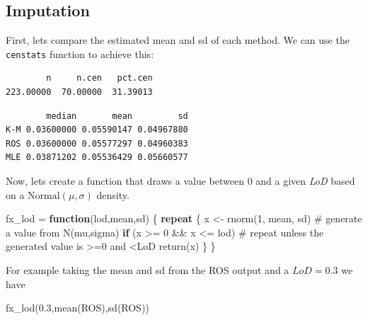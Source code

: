 \documentclass[
  letterpaper,
  DIV=11,
  numbers=noendperiod]{scrartcl}
\newenvironment{Shaded}{\begin{snugshade}}{\end{snugshade}}
\newcommand{\CommentTok}[1]{\textcolor[rgb]{0.37,0.37,0.37}{#1}}
\newcommand{\ControlFlowTok}[1]{\textcolor[rgb]{0.00,0.23,0.31}{\textbf{#1}}}
\newcommand{\DecValTok}[1]{\textcolor[rgb]{0.68,0.00,0.00}{#1}}
\newcommand{\FloatTok}[1]{\textcolor[rgb]{0.68,0.00,0.00}{#1}}
\newcommand{\FunctionTok}[1]{\textcolor[rgb]{0.28,0.35,0.67}{#1}}
\newcommand{\NormalTok}[1]{\textcolor[rgb]{0.00,0.23,0.31}{#1}}
\newcommand{\OtherTok}[1]{\textcolor[rgb]{0.00,0.23,0.31}{#1}}
\newcommand{\SpecialCharTok}[1]{\textcolor[rgb]{0.37,0.37,0.37}{#1}}
\begin{document}
\subsection{Imputation}\label{imputation}

First, lets compare the estimated mean and sd of each method. We can use
the \texttt{censtats} function to achieve this:

\begin{Shaded}
\end{Shaded}

\begin{verbatim}
        n     n.cen   pct.cen 
223.00000  70.00000  31.39013 
\end{verbatim}

\begin{verbatim}
        median       mean         sd
K-M 0.03600000 0.05590147 0.04967880
ROS 0.03600000 0.05577297 0.04960383
MLE 0.03871202 0.05536429 0.05660577
\end{verbatim}

Now, lets create a function that draws a value between 0 and a given
\emph{LoD} based on a \(\mathrm{Normal}(\mu,\sigma)\) density.

\begin{Shaded}
\begin{Highlighting}[]
\NormalTok{fx\_lod }\OtherTok{=} \ControlFlowTok{function}\NormalTok{(lod,mean,sd) \{}
    \ControlFlowTok{repeat}\NormalTok{ \{}
\NormalTok{      x }\OtherTok{\textless{}{-}} \FunctionTok{rnorm}\NormalTok{(}\DecValTok{1}\NormalTok{, mean, sd) }\CommentTok{\# generate a value from N(mu,sigma)}
      \ControlFlowTok{if}\NormalTok{ (x }\SpecialCharTok{\textgreater{}=} \DecValTok{0} \SpecialCharTok{\&\&}\NormalTok{ x }\SpecialCharTok{\textless{}=}\NormalTok{ lod) }\CommentTok{\# repeat unless the generated value is \textgreater{}=0 and \textless{}LoD}
        \FunctionTok{return}\NormalTok{(x)   }
\NormalTok{    \}}
\NormalTok{\}}
\end{Highlighting}
\end{Shaded}

For example taking the mean and sd from the ROS output and a
\(LoD = 0.3\) we have

\begin{Shaded}
\begin{Highlighting}[]
\FunctionTok{fx\_lod}\NormalTok{(}\FloatTok{0.3}\NormalTok{,}\FunctionTok{mean}\NormalTok{(ROS),}\FunctionTok{sd}\NormalTok{(ROS))}
\end{Highlighting}
\end{Shaded}
\end{document}
